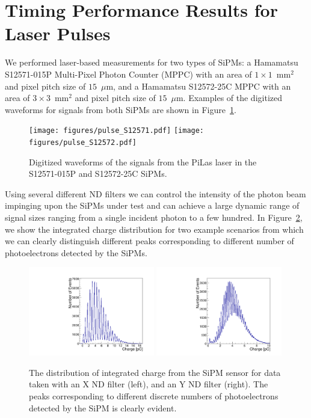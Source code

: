 \section{Timing Performance Results for Laser Pulses}
\label{sec:lasertiming}

We performed laser-based measurements for two types of SiPMs: a Hamamatsu
S12571-015P Multi-Pixel Photon Counter (MPPC) with an area of $1\times
1$~$\mathrm{mm}^{2}$ and pixel pitch size of $15$~$\mu$m, and a Hamamatsu
S12572-25C MPPC with an area of $3\times 3$~$\mathrm{mm}^{2}$ and pixel pitch
size of $15$~$\mu$m. Examples of the digitized waveforms for signals from both 
SiPMs are shown in Figure~\ref{fig:pulses}.

\begin{figure}[htbp] 
\centering
\texttt{[image: figures/pulse\_S12571.pdf]} 
\texttt{[image: figures/pulse\_S12572.pdf]} 
\caption{Digitized waveforms of the signals from the PiLas laser 
in the S12571-015P and S12572-25C SiPMs.} 
\label{fig:pulses} 
\end{figure} 

Using several different ND filters we can control the intensity of the photon 
beam impinging upon the SiPMs under test and can achieve a large dynamic range 
of signal sizes ranging from a single incident photon to a few hundred. In 
Figure~\ref{fig:NPhotonPeaks}, we show the integrated charge distribution
for two example scenarios from which we can clearly distinguish different peaks
corresponding to different number of photoelectrons detected by the SiPMs.

\begin{figure}[htbp] 
\centering
\includegraphics[width=0.49\textwidth]{figures/NPhotons1.pdf} 
\includegraphics[width=0.49\textwidth]{figures/NPhotons2.pdf} 
\caption{The distribution of integrated charge from the SiPM sensor for data 
taken with an X ND filter (left), and an Y ND filter (right). The peaks corresponding
to different discrete numbers of photoelectrons detected by the SiPM is clearly
evident.} 
\label{fig:NPhotonPeaks} 
\end{figure} 

